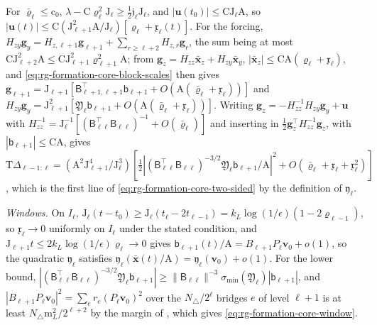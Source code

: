 For \(\bar\varrho_\ell\le\mathrm c_0\),
\(\lambda-\mathrm C\varrho_\ell^2\mathrm J_\ell\ge\tfrac12\mathfrak j_\ell\mathrm J_\ell\),
and \(|\mathbf u(t_0)|\le\mathrm C\mathrm J_\ell\mathrm A\), so
\(|\mathbf u(t)|\le\mathrm C(\mathrm J_{\ell+1}^2\mathrm A/\mathrm J_\ell)[\varrho_\ell+\mathfrak x_\ell(t)]\).
For the forcing,
\(H_{zy}\mathbf g_y=H_{z,\ell+1}\mathbf g_{\ell+1}+\sum_{r\ge\ell+2}H_{z,r}\mathbf g_r\),
the sum being at most
\(\mathrm C\mathrm J_{\ell+2}^2\mathrm A\le\mathrm C\mathrm J_{\ell+1}^2\varrho_{\ell+1}^2\mathrm A\);
from \(\mathbf g_z=H_{zz}\bar{\mathbf x}_z+H_{zy}\bar{\mathbf x}_y\),
\(|\bar{\mathbf x}_z|\le\mathrm C\mathrm A(\varrho_\ell+\mathfrak x_\ell)\),
and \cref{eq:rg-formation-core-block-scales} then gives
\(\mathbf g_{\ell+1}=\mathrm J_{\ell+1}[\mathsf B_{\ell+1,\ell+1}^\top\mathsf b_{\ell+1}+O(\mathrm A(\bar\varrho_\ell+\mathfrak x_\ell))]\)
and
\(H_{zy}\mathbf g_y=\mathrm J_{\ell+1}^2[\mathfrak Y_\ell\mathsf b_{\ell+1}+O(\mathrm A(\bar\varrho_\ell+\mathfrak x_\ell))]\).
Writing \(\mathbf g_z=-H_{zz}^{-1}H_{zy}\mathbf g_y+\mathbf u\) with
\(H_{zz}^{-1}=\mathrm J_\ell^{-1}[(\mathsf B_{\ell\ell}^\top\mathsf B_{\ell\ell})^{-1}+O(\bar\varrho_\ell)]\)
and inserting in \(\tfrac12\mathbf g_z^\top H_{zz}^{-1}\mathbf g_z\), with
\(|\mathsf b_{\ell+1}|\le\mathrm C\mathrm A\), gives
\(\mathrm T\Delta_{\ell-1:\ell}=(\mathrm A^2\mathrm J_{\ell+1}^4/\mathrm J_\ell^3)
[\tfrac12|(\mathsf B_{\ell\ell}^\top\mathsf B_{\ell\ell})^{-3/2}\mathfrak Y_\ell\mathsf b_{\ell+1}/\mathrm A|^2
+O(\bar\varrho_\ell+\mathfrak x_\ell+\mathfrak x_\ell^2)]\), which is the
first line of \cref{eq:rg-formation-core-two-sided} by the definition of
\(\mathfrak y_\ell\).

\emph{Windows.} On \(I_\ell\),
\(\mathrm J_\ell(t-t_0)\ge\mathrm J_\ell(t_\ell-2t_{\ell-1})=k_L\log(1/\epsilon)(1-2\varrho_{\ell-1})\),
so \(\mathfrak x_\ell\to0\) uniformly on \(I_\ell\) under the stated
condition, and \(\mathrm J_{\ell+1}t\le2k_L\log(1/\epsilon)\varrho_\ell\to0\)
gives \(\mathsf b_{\ell+1}(t)/\mathrm A=B_{\ell+1}P_\ell\mathbf v_0+o(1)\), so
the quadratic \(\mathfrak y_\ell\) satisfies
\(\mathfrak y_\ell(\bar{\mathbf x}(t)/\mathrm A)=\mathfrak y_\ell(\mathbf v_0)+o(1)\).
For the lower bound,
\(|(\mathsf B_{\ell\ell}^\top\mathsf B_{\ell\ell})^{-3/2}\mathfrak Y_\ell\mathsf b_{\ell+1}|
\ge\|\mathsf B_{\ell\ell}\|^{-3}\sigma_{\min}(\mathfrak Y_\ell)|\mathsf b_{\ell+1}|\),
and \(|B_{\ell+1}P_\ell\mathbf v_0|^2=\sum_er_e(P_\ell\mathbf v_0)^2\) over
the \(N_\triangle/2^\ell\) bridges \(e\) of level \(\ell+1\) is at least
\(N_\triangle\mathrm m_L^2/2^{\ell+2}\) by the margin of
, which gives
\cref{eq:rg-formation-core-window}.

